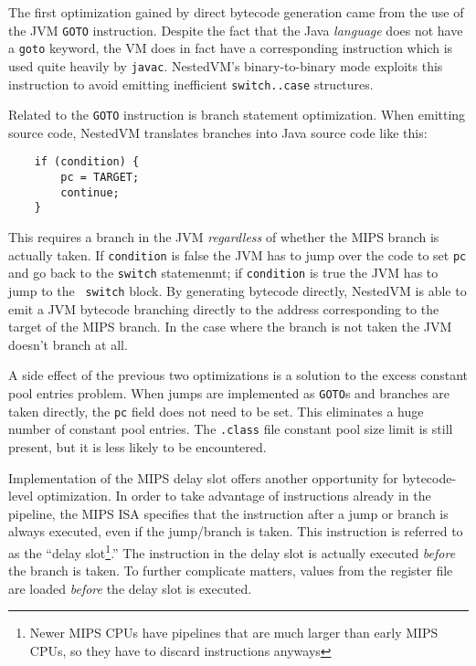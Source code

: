 \documentclass{acmconf}
\begin{document}

The first optimization gained by direct bytecode generation came from
the use of the JVM {\tt GOTO} instruction.  Despite the fact that the
Java {\it language} does not have a {\tt goto} keyword, the VM does in
fact have a corresponding instruction which is used quite heavily by
{\tt javac}.  NestedVM's binary-to-binary mode exploits this
instruction to avoid emitting inefficient {\tt switch..case}
structures.

Related to the {\tt GOTO} instruction is branch statement
optimization.  When emitting source code, NestedVM translates branches
into Java source code like this:

{\footnotesize\begin{verbatim}
    if (condition) {
        pc = TARGET;
        continue;
    }
\end{verbatim}}

This requires a branch in the JVM {\it regardless} of whether the MIPS
branch is actually taken.  If {\tt condition} is false the JVM has to
jump over the code to set {\tt pc} and go back to the {\tt switch}
statemenmt; if {\tt condition} is true the JVM has to jump to the {\tt
switch} block.  By generating bytecode directly, NestedVM is able to
emit a JVM bytecode branching directly to the address corresponding to
the target of the MIPS branch.  In the case where the branch is not
taken the JVM doesn't branch at all.

A side effect of the previous two optimizations is a solution to the
excess constant pool entries problem.  When jumps are implemented as
{\tt GOTO}s and branches are taken directly, the {\tt pc} field does
not need to be set.  This eliminates a huge number of constant pool
entries.  The {\tt .class} file constant pool size limit is still
present, but it is less likely to be encountered.

Implementation of the MIPS delay slot offers another opportunity for
bytecode-level optimization.  In order to take advantage of
instructions already in the pipeline, the MIPS ISA specifies that the
instruction after a jump or branch is always executed, even if the
jump/branch is taken.  This instruction is referred to as the ``delay
slot\footnote{Newer MIPS CPUs have pipelines that are much larger than
early MIPS CPUs, so they have to discard instructions anyways}.''  The
instruction in the delay slot is actually executed {\it before} the
branch is taken.  To further complicate matters, values from the
register file are loaded {\it before} the delay slot is executed.
\end{document}
